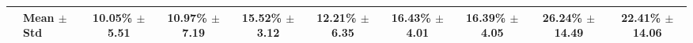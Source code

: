 \begin{table}[t]
{\begin{tabular}{ll*{8}{c}}
\midrule
 & \textbf{Mean $\pm$ Std} & 10.05\% $\pm$ 5.51 & 10.97\% $\pm$ 7.19 & 15.52\% $\pm$ 3.12 & 12.21\% $\pm$ 6.35 & 16.43\% $\pm$ 4.01 & 16.39\% $\pm$ 4.05 & 26.24\% $\pm$ 14.49 & 22.41\% $\pm$ 14.06 \\
\bottomrule
\end{tabular}
}
\end{table}
